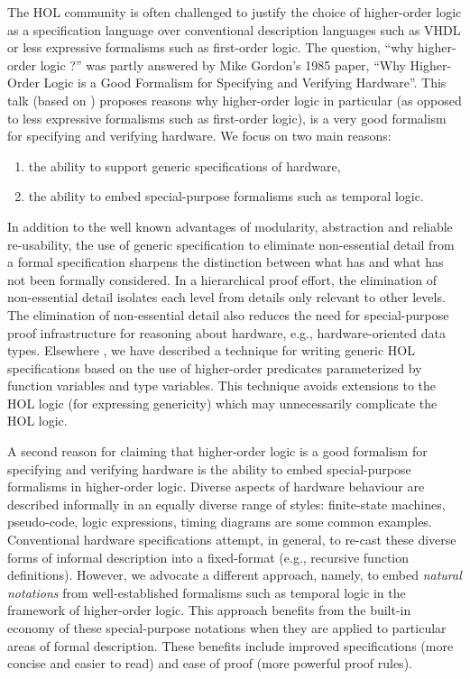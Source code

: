 The HOL community is often challenged to justify the choice of
higher-order logic as a specification language over
conventional description languages such as VHDL or
less expressive formalisms such as first-order logic.
The question, ``why higher-order logic ?'' was partly answered by
Mike Gordon's 1985 paper,
``Why Higher-Order Logic
is a Good Formalism for Specifying and Verifying Hardware''.
This talk (based on \cite{Joyce:miami})
proposes reasons why higher-order logic
in particular (as opposed to less expressive formalisms
such as first-order logic), is a very good
formalism for specifying and verifying hardware.
We focus on two main reasons:
\begin{enumerate}
\item the ability to support generic specifications of hardware,
\item the ability to embed special-purpose formalisms such
as temporal logic.
\end{enumerate}

In addition to the well known advantages of modularity, abstraction
and reliable re-usability,
the use of generic specification to eliminate non-essential detail
from a formal specification sharpens the distinction between what has
and what has not been formally considered.
In a hierarchical proof effort,
the elimination of non-essential detail isolates each level from
details only relevant to other levels.
The elimination of non-essential detail
also reduces the need for special-purpose proof infrastructure
for reasoning about hardware, e.g.,
hardware-oriented data types.
Elsewhere \cite{Joyce:thesis,Joyce:oxford},
we have described a technique for writing generic HOL specifications
based on the use of higher-order predicates
parameterized by function variables and type variables.
This technique avoids extensions to the HOL logic
(for expressing genericity) which may unnecessarily
complicate the HOL logic.

A second reason for claiming that higher-order logic is a good
formalism for specifying and verifying hardware is the ability
to embed special-purpose formalisms in higher-order logic.
Diverse aspects of hardware behaviour are described informally
in an equally diverse range of styles: finite-state machines,
pseudo-code, logic expressions, timing diagrams are some
common examples.
Conventional hardware specifications attempt, in general,
to re-cast these diverse forms of informal
description into a fixed-format (e.g., recursive function definitions).
However,
we advocate a different approach, namely, to embed {\it natural
notations} from well-established formalisms such as temporal
logic in the framework of higher-order
logic.
This approach benefits from the built-in economy of these
special-purpose notations when they are applied to particular
areas of formal description.
These benefits include improved specifications
(more concise and easier to read) and ease of proof
(more powerful proof rules).

